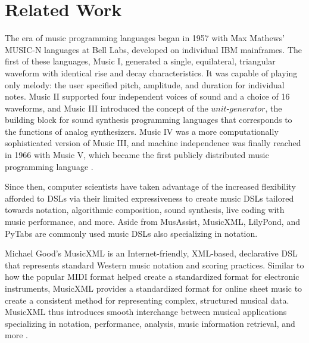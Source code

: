 \documentclass{article}
\begin{document}
\section{Related Work}\label{sec:related_work}

The era of music programming languages began in 1957 with Max Mathews' MUSIC-N languages at Bell Labs, developed on individual IBM mainframes. The first of these languages, Music I, generated a single, equilateral, triangular waveform with identical rise and decay characteristics. It was capable of playing only melody: the user specified pitch, amplitude, and duration for individual notes. Music II supported four independent voices of sound and a choice of 16 waveforms, and Music III introduced the concept of the $unit$-$generator$, the building block for sound synthesis programming languages that corresponds to the functions of analog synthesizers. Music IV was a more computationally sophisticated version of Music III, and machine independence was finally reached in 1966 with Music V, which became the first publicly distributed music programming language \cite{mathews_1957}.


Since then, computer scientists have taken advantage of the increased flexibility afforded to DSLs via their limited expressiveness to create music DSLs tailored towards notation, algorithmic composition, sound synthesis, live coding with music performance, and more. Aside from MusAssist, MusicXML, LilyPond, and PyTabs are commonly used music DSLs also specializing in notation.

Michael Good’s MusicXML is an Internet-friendly, XML-based, declarative DSL that represents standard Western music notation and scoring practices. Similar to how the popular MIDI format helped create a standardized format for electronic instruments, MusicXML provides a standardized format for online sheet music to create a consistent method for representing complex, structured musical data. MusicXML thus introduces smooth interchange between musical applications specializing in notation, performance, analysis, music information retrieval, and more \cite{good_2013}.
\end{document}
